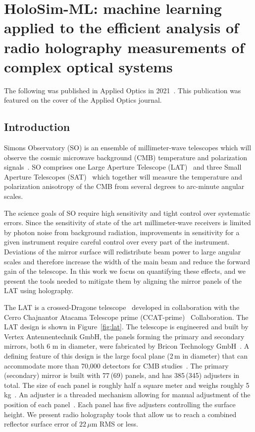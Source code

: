 \chapter{HoloSim-ML: machine learning applied to the efficient analysis of radio holography measurements of complex optical systems}
\label{ch:holosim}
The following was published in Applied Optics in 2021~\cite{Chesmore:21}.  This publication was featured on the cover of the Applied Optics journal.
\section{Introduction}
Simons Observatory (SO) is an ensemble of millimeter-wave telescopes which will observe the cosmic microwave background (CMB) temperature and polarization signals~\cite{gali18, so19}. SO comprises one Large Aperture Telescope (LAT)~\cite{Niemack:16, Gudmundsson:21,Parshley_2018} and three Small Aperture Telescopes (SAT)~\cite{ali20} which together will measure the temperature and polarization anisotropy of the CMB from several degrees to arc-minute angular scales.

The science goals of SO require high sensitivity and tight control over systematic errors.  Since the sensitivity of state of the art millimeter-wave receivers is limited by photon noise from background radiation, improvements in sensitivity for a given instrument require careful control over every part of the instrument.  Deviations of the mirror surface will redistribute beam power to large angular scales and therefore increase the width of the main beam and reduce the forward gain of the telescope.  In this work we focus on quantifying these effects, and we present the tools needed to mitigate them by aligning the mirror panels of the LAT using holography.

The LAT is a crossed-Dragone telescope~\cite{6773968,Gudmundsson:21,Niemack:16,2021RNAAS...5..100X} developed in collaboration with the Cerro Chajnantor Atacama Telescope prime (CCAT-prime)~\cite{ccat,aravena2019ccatprime} Collaboration.  The LAT design is shown in Figure~\ref{fig:lat}.  The telescope is engineered and built by Vertex Antennentechnik GmbH, the panels forming the primary and secondary mirrors, both 6 m in diameter, were fabricated by Bricon Technology GmbH~\cite{vertex}.  A defining feature of this design is the large focal plane (2\,m in diameter) that can accommodate more than 70,000 detectors for CMB studies~\cite{Parshley_2018,zhu2021simons,mccarrick2021simons}. The primary\,(secondary) mirror is built with 77\,(69) panels, and has 385\,(345) adjusters in total.  The size of each panel is roughly half a square meter and weighs roughly 5\,kg~\cite{ccat}.  An adjuster is a threaded mechanism allowing for manual adjustment of the position of each panel~\cite{Woody}.  Each panel has five adjusters controlling the surface height.  We present radio holography tools that allow us to reach a combined reflector surface error of $22\,\mu$m RMS or less.

